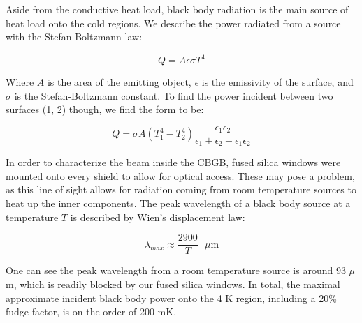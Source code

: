 Aside from the conductive heat load, black body radiation is the main source of heat load onto the cold regions. We describe the power radiated from a source with the Stefan-Boltzmann law:

\begin{equation}
	\dot{Q} = A \epsilon \sigma T^4
\end{equation}

Where $A$ is the area of the emitting object, $\epsilon$ is the emissivity of the surface, and $\sigma$ is the Stefan-Boltzmann constant. To find the power incident between two surfaces (1, 2) though, we find the form to be:

\begin{equation}
	\dot{Q} = \sigma A (T_1^4 - T_2^4)\frac{\epsilon_1 \epsilon_2}{\epsilon_1 + \epsilon_2 - \epsilon_1 \epsilon_2}
\end{equation}

In order to characterize the beam inside the CBGB, fused silica windows were mounted onto every shield to allow for optical access. These may pose a problem, as this line of sight allows for radiation coming from room temperature sources to heat up the inner components. The peak wavelength of a black body source at a temperature $T$ is described by Wien's displacement law:

\begin{equation}
	\lambda_{max} \approx \frac{2900}{T}\text{ $\mu$m}
	\label{eq: BBR peak lambda}
\end{equation}

One can see the peak wavelength from a room temperature source is around 93 $\mu$m, which is readily blocked by our fused silica windows. In total, the maximal approximate incident black body power onto the 4 K region, including a 20\% fudge factor, is on the order of 200 mK.